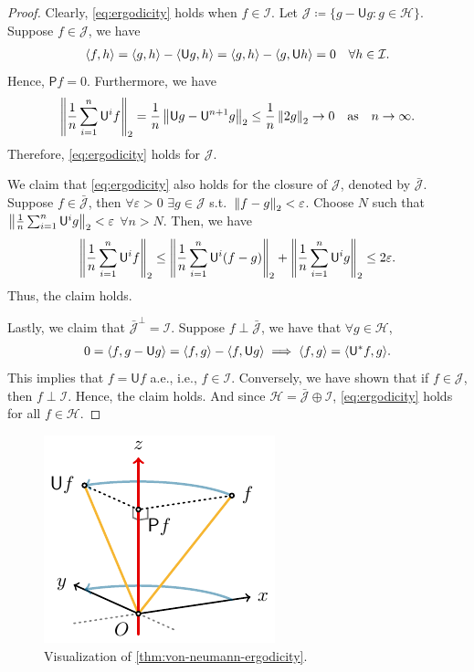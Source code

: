 \documentclass[a4paper]{article}
\begin{document}
\begin{proof}
	Clearly, \autoref{eq:ergodicity} holds when $f\in\mathcal{I}$.
	Let $\mathcal{J}\coloneqq\{g-\mathsf{U}g:g\in\mathcal{H}\}$.
	Suppose $f\in\mathcal{J}$, we have
	\begin{align*}
		\langle{f,h}\rangle
		= \langle{g,h}\rangle - \langle{\mathsf{U}g,h}\rangle
		= \langle{g,h}\rangle - \langle{g,\mathsf{U}h}\rangle
		= 0 \quad \forall h\in\mathcal{I}.
	\end{align*}
	Hence, $\mathsf{P}f=0$.
	Furthermore, we have
	\begin{align*}
		\left\| \frac1n \sum_{i=1}^{n} \mathsf{U}^{i}f \right\|_{2}
		= \frac1n \left\| \mathsf{U}g - \mathsf{U}^{n+1}g \right\|_{2}
		\leq \frac1n \left\| 2g \right\|_{2}
		\to 0
		\quad\text{as}\quad
		n\to\infty.
	\end{align*}
	Therefore, \autoref{eq:ergodicity} holds for $\mathcal{J}$.

	We claim that \autoref{eq:ergodicity} also holds for the closure of $\mathcal{J}$,
	denoted by $\bar{\mathcal{J}}$.
	Suppose $f\in\bar{\mathcal{J}}$,
	then $\forall\varepsilon>0$ $\exists g\in\mathcal{J}$ s.t.\ $\left\|f-g\right\|_{2}<\varepsilon$.
	Choose $N$ such that
	$\left\| \frac1n \sum_{i=1}^{n} \mathsf{U}^{i}g \right\|_{2} < \varepsilon$ $\forall n>N$.
	Then, we have
	\begin{align*}
		\left\| \frac1n \sum_{i=1}^{n} \mathsf{U}^{i} f \right\|_{2}
		\leq \left\| \frac1n \sum_{i=1}^{n} \mathsf{U}^{i} (f-g) \right\|_{2}
		+ \left\| \frac1n \sum_{i=1}^{n} \mathsf{U}^{i} g \right\|_{2} \leq 2\varepsilon.
	\end{align*}
	Thus, the claim holds.

	Lastly, we claim that $\bar{\mathcal{J}}^{\perp}=\mathcal{I}$.
	Suppose $f\perp\bar{\mathcal{J}}$, we have that $\forall g\in\mathcal{H}$,
	\begin{align*}
		0
		= \langle{f,g-\mathsf{U}g}\rangle
		= \langle{f,g}\rangle - \langle{f,\mathsf{U}g}\rangle
		\implies
		\langle{f,g}\rangle=\langle{\mathsf{U}^{*}f,g}\rangle.
	\end{align*}
	This implies that $f=\mathsf{U}f$ a.e., i.e., $f\in\mathcal{I}$.
	Conversely, we have shown that if $f\in\mathcal{J}$, then $f\perp\mathcal{I}$.
	Hence, the claim holds.
	And since $\mathcal{H}=\bar{\mathcal{J}}\oplus\mathcal{I}$,
	\autoref{eq:ergodicity} holds for all $f\in\mathcal{H}$.
\end{proof}

\begin{figure}[h]
	\centering
	\includegraphics[scale=1]{figures/rotation.pdf}
	\caption{Visualization of \autoref{thm:von-neumann-ergodicity}.}
	\label{fig:ration}
\end{figure}
\end{document}
